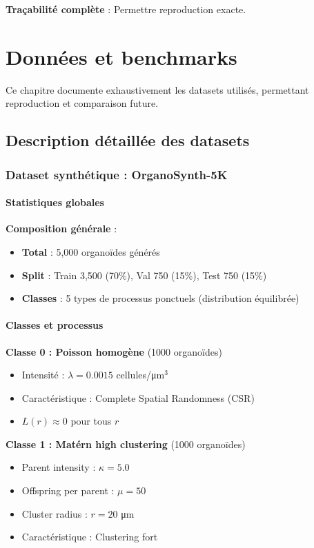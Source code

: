 \textbf{Traçabilité complète} : Permettre reproduction exacte.

\chapter{Données et benchmarks}

Ce chapitre documente exhaustivement les datasets utilisés, permettant reproduction et comparaison future.

\section{Description détaillée des datasets}

\subsection{Dataset synthétique : OrganoSynth-5K}

\subsubsection{Statistiques globales}

\textbf{Composition générale} :
\begin{itemize}
    \item \textbf{Total} : 5,000 organoïdes générés
    \item \textbf{Split} : Train 3,500 (70\%), Val 750 (15\%), Test 750 (15\%)
    \item \textbf{Classes} : 5 types de processus ponctuels (distribution équilibrée)
\end{itemize}

\subsubsection{Classes et processus}

\textbf{Classe 0 : Poisson homogène} (1000 organoïdes)
\begin{itemize}
    \item Intensité : $\lambda = 0.0015$ cellules/μm$^3$
    \item Caractéristique : Complete Spatial Randomness (CSR)
    \item $L(r) \approx 0$ pour tous $r$
\end{itemize}

\textbf{Classe 1 : Matérn high clustering} (1000 organoïdes)
\begin{itemize}
    \item Parent intensity : $\kappa = 5.0$
    \item Offspring per parent : $\mu = 50$
    \item Cluster radius : $r = 20$ μm
    \item Caractéristique : Clustering fort
\end{itemize}

